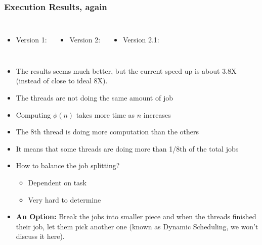 \documentclass[aspectratio=43,11pt]{beamer}
\begin{document}
\begin{frame}
  \frametitle{Execution Results, again}

  \begin{columns}
  \begin{itemize}
    \item Version 1: \\
    \fontsize{8pt}{7.2}\selectfont{\tt real 0m38.191s \\
         user 0m38.180s \\
         sys  0m0.002s}  
  \end{itemize}
  \begin{itemize}
    \item Version 2: \\
    \fontsize{8pt}{7.2}\selectfont{\tt real 0m38.214s \\
         user 0m38.708s \\
         sys  0m0.075s}  
  \end{itemize}
  \begin{itemize}
    \item Version 2.1: \\
    \fontsize{8pt}{7.2}\selectfont{\tt real 0m9.975s \\
           user 0m41.427s \\
           sys  0m0.007s}
  \end{itemize}
  \end{columns}
  \vfill
  \begin{itemize}
    \item<1-> The results seems much better, but the current speed up is about 3.8X (instead of close to ideal 8X).
    \item<2-> The threads are not doing the same amount of job
    \item<3-> Computing $\phi(n)$ takes more time as $n$ increases
    \item<4-> The 8th thread is doing more computation than the others
    \item<4-> It means that some threads are doing more than 1/8th of the total jobs
    \item<5-> How to balance the job splitting?
    \begin{itemize}
      \item Dependent on task
      \item Very hard to determine
    \end{itemize}
    \item<6-> \textbf{An Option:} Break the jobs into smaller piece and when the threads finished
    their job, let them pick another one (known as Dynamic Scheduling, we won't discuss it here).
  \end{itemize}
\end{frame}
\end{document}
